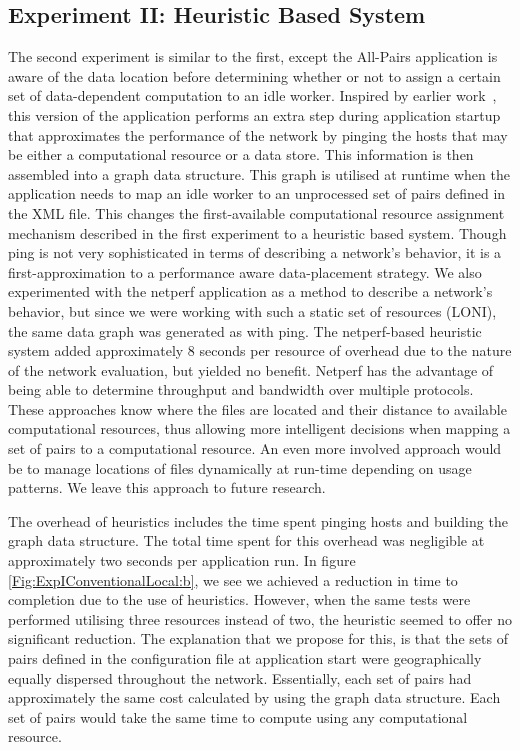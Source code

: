 \documentclass{rspublic}
\begin{document}
\subsection{Experiment II: Heuristic Based System}\label{Sec:Heuristic}
The second experiment is similar to the first, except the All-Pairs
application is aware of the data location before determining whether or
not to assign a certain set of data-dependent computation to an idle
worker. Inspired by earlier work~\citep{netperf}, this version of the
application performs an extra step during application startup that
approximates the performance of the network by pinging the hosts that
may be either a computational resource or a data store. This information
is then assembled into a graph data structure. This graph is utilised at
runtime when the application needs to map an idle worker to an
unprocessed set of pairs defined in the XML file. This changes the
first-available computational resource assignment mechanism described in
the first experiment to a heuristic based system. Though ping is not
very sophisticated in terms of describing a network's behavior, it is a
first-approximation to a performance aware data-placement strategy. We
also experimented with the netperf application \citep{netperf_web} as a
method to describe a network's behavior, but since we were working with
such a static set of resources (LONI), the same data graph was generated
as with ping. The netperf-based heuristic system added approximately 8
seconds per resource of overhead due to the nature of the network
evaluation, but yielded no benefit.  Netperf has the advantage of being
able to determine throughput and bandwidth over multiple protocols.
These approaches know where the files are located and their distance to
available computational resources, thus allowing more intelligent
decisions when mapping a set of pairs to a computational resource. An
even more involved approach would be to manage locations of files
dynamically at run-time depending on usage patterns. We leave this
approach to future research. 

The overhead of heuristics includes the time spent pinging hosts and
building the graph data structure. The total time spent for this
overhead was negligible at approximately two seconds per application
run. In figure \ref{Fig:ExpIConventionalLocal:b}, we see we achieved a
reduction in time to completion due to the use of heuristics. However,
when the same tests were performed utilising three resources instead of
two, the heuristic seemed to offer no significant reduction. The
explanation that we propose for this, is that the sets of pairs defined
in the configuration file at application start were geographically
equally dispersed throughout the network. Essentially, each set of pairs
had approximately the same cost calculated by using the graph data
structure. Each set of pairs would take the same time to compute using
any computational resource.
\end{document}
